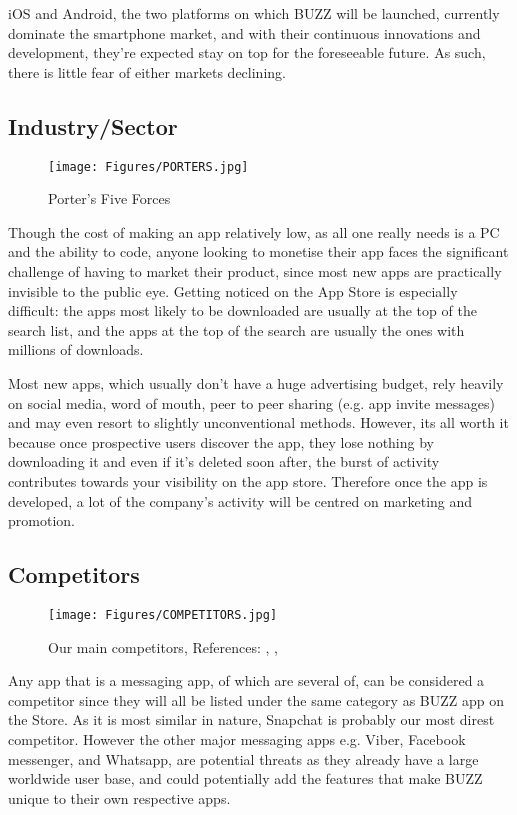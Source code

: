 \documentclass[12pt]{article}
\begin{document}
iOS and Android, the two platforms on which BUZZ will be launched, currently dominate the smartphone market, and with their continuous innovations and development, they’re expected stay on top for the foreseeable future. As such, there is little fear of either markets declining.

\subsection{Industry/Sector}

\begin{figure}
    \centering
    \texttt{[image: Figures/PORTERS.jpg]}
    \caption{Porter’s Five Forces \cite{Burns2014}}
    \label{fig:porters}
\end{figure}

Though the cost of making an app relatively low, as all one really needs is a PC and the ability to code, anyone looking to monetise their app faces the significant challenge of having to market their product, since most new apps are practically invisible to the public eye. Getting noticed on the App Store is especially difficult: the apps most likely to be downloaded are usually at the top of the search list, and the apps at the top of the search are usually the ones with millions of downloads.
 
Most new apps, which usually don't have a huge advertising budget, rely heavily on social media, word of mouth, peer to peer sharing (e.g. app invite messages) and may even resort to slightly unconventional methods. However, its all worth it because once prospective users discover the app, they lose nothing by downloading it and even if it's deleted soon after, the burst of activity contributes towards your visibility on the app store. Therefore once the app is developed, a lot of the company's activity will be centred on marketing and promotion.

\subsection{Competitors}

\begin{figure}
    \centering
    \texttt{[image: Figures/COMPETITORS.jpg]}
    \caption{Our main competitors, References: \cite{Shontell2015}, \cite{Facebookn.d.}, \cite{WhatsAppn.d.}
}
    \label{fig:competitors}
\end{figure}

Any app that is a messaging app, of which are several of, can be considered a competitor since they will all be listed under the same category as BUZZ app on the Store. As it is most similar in nature, Snapchat is probably our most direst competitor. However the other major messaging apps e.g. Viber, Facebook messenger, and Whatsapp, are potential threats as they already have a large worldwide user base, and could potentially add the features that make BUZZ unique to their own respective apps.
\end{document}

